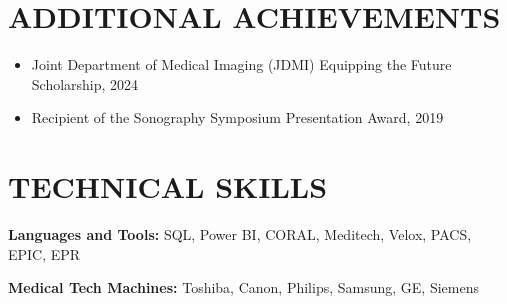 \documentclass[letterpaper,11pt]{article}
\newcommand{\resumeItem}[1]{
  \item\small{
    {#1 \vspace{-1pt}}
  }
}
\newcommand{\resumeItemListStart}{\begin{itemize}[leftmargin=0.1in]}
\newcommand{\resumeItemListEnd}{\end{itemize}\vspace{-5pt}}
\begin{document}
\section{\color{airforceblue}ADDITIONAL ACHIEVEMENTS}    
    \resumeItemListStart
        \vspace{0.5pt}
        \resumeItem{\normalsize{Joint Department of Medical Imaging (JDMI) Equipping the Future Scholarship, 2024}}
        \vspace{-5pt}
        \resumeItem{\normalsize{Recipient of the Sonography Symposium Presentation Award, 2019}}
        \vspace{-5pt}
        

        
    \resumeItemListEnd  
   
%

\section{\color{airforceblue} TECHNICAL SKILLS}
 \begin{itemize}[leftmargin=0in, label={}]
    \small{\item{
     \textbf{\normalsize{Languages and Tools:}}{ \normalsize{SQL, Power BI, CORAL, Meditech, Velox, PACS, EPIC, EPR}} \\
      \vspace{1.2pt}
      
     \textbf{\normalsize{Medical Tech Machines:}}{ \normalsize{Toshiba, Canon, Philips, Samsung, GE, Siemens}} \\
      \vspace{1.2pt}
      

     }}
 \end{itemize}
 \vspace{-16pt}
\end{document}
